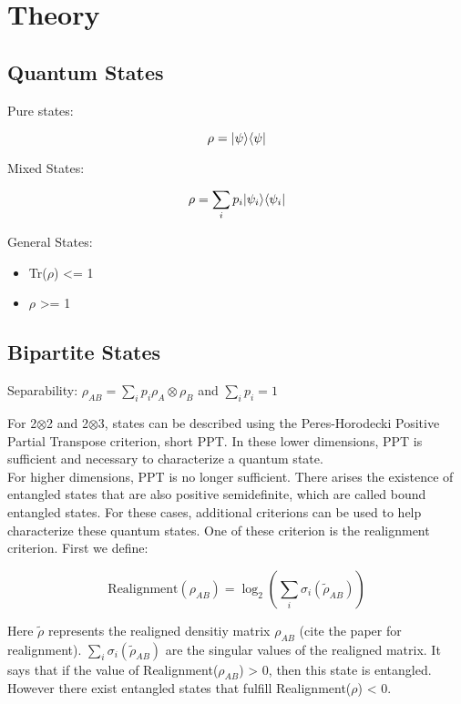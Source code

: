 \chapter{Theory}

\section{Quantum States}

Pure states:

\begin{equation}
    \rho = \lvert\psi\rangle\langle\psi\rvert
\end{equation}

Mixed States:

\begin{equation}
    \rho = \sum_{i} p_i \lvert\psi_i\rangle\langle\psi_i\rvert
\end{equation}

General States:

\begin{itemize}
    \item Tr($\rho$) <= 1
    \item $\rho$ >= 1
\end{itemize}

\section{Bipartite States}

Separability: $\rho_{AB} = \sum_{i} p_i \rho_A \otimes \rho_B$ and $\sum_{i} p_i = 1$

For 2$\otimes$2 and 2$\otimes$3, states can be described using the Peres-Horodecki Positive Partial Transpose criterion, short PPT.
In these lower dimensions, PPT is sufficient and necessary to characterize a quantum state.\\

For higher dimensions, PPT is no longer sufficient. There arises the existence of entangled states that are also positive semidefinite, which are called bound entangled states.
For these cases, additional criterions can be used to help characterize these quantum states. One of these criterion is the realignment criterion. First we define:

\begin{equation}
    \text{Realignment}(\rho_{AB}) = \log_2({\sum_{i}\sigma_i(\tilde{\rho}_{AB})})
\end{equation}

Here $\tilde{\rho}$ represents the realigned densitiy matrix $\rho_{AB}$ (cite the paper for realignment). $\sum_i\sigma_i(\tilde{\rho}_{AB})$ are the singular values of the realigned matrix.
It says that if the value of Realignment($\rho_{AB}$) > 0, then this state is entangled. However there exist entangled states that fulfill Realignment($\rho$) < 0.

